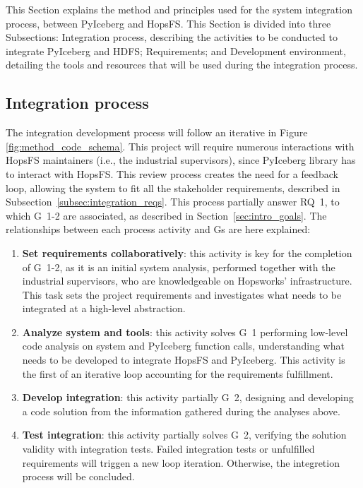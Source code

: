 This Section explains the method and principles used for the system integration process, between PyIceberg and \gls{HopsFS}. This Section is divided into three Subsections: Integration process, describing the activities to be conducted to integrate PyIceberg and \gls{HDFS}; Requirements; and Development environment, detailing the tools and resources that will be used during the integration process.


\subsection{Integration process}
\label{subsec:integration_process}
The integration development process will follow an iterative in Figure \ref{fig:method_code_schema}. This project will require numerous interactions with \gls{HopsFS} maintainers (i.e., the industrial supervisors), since PyIceberg library has to interact with \gls{HopsFS}. This review process creates the need for a feedback loop, allowing the system to fit all the stakeholder requirements, described in Subsection~\ref{subsec:integration_reqs}. This process partially answer \gls{RQ}~1, to which \gls{G}~1-2 are associated, as described in Section~\ref{sec:intro_goals}. The relationships between each process activity and \glspl{G} are here explained:

\begin{enumerate}
    \item \textbf{Set requirements collaboratively}: this activity is key for the completion of \gls{G}~1-2, as it is an initial system analysis, performed together with the industrial supervisors, who are knowledgeable on Hopsworks' infrastructure. This task sets the project requirements and investigates what needs to be integrated at a high-level abstraction.
    \item \textbf{Analyze system and tools}: this activity solves \gls{G}~1 performing low-level code analysis on system and PyIceberg function calls, understanding what needs to be developed to integrate \gls{HopsFS} and PyIceberg. This activity is the first of an iterative loop accounting for the requirements fulfillment.
    \item \textbf{Develop integration}: this activity partially \gls{G}~2, designing and developing a code solution from the information gathered during the analyses above.
    \item \textbf{Test integration}: this activity partially solves \gls{G}~2, verifying the solution validity with integration tests. Failed integration tests or unfulfilled requirements will triggen a new loop iteration. Otherwise, the integretion process will be concluded.
\end{enumerate}

